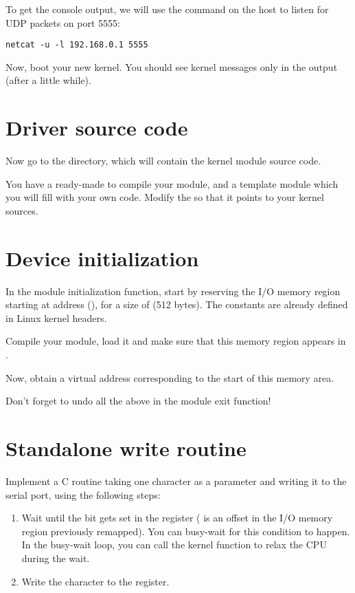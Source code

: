To get the console output, we will use the  command on the host
to listen for UDP packets on port 5555:

\begin{verbatim}
netcat -u -l 192.168.0.1 5555
\end{verbatim}

Now, boot your new kernel. You should see kernel messages only in the
 output (after a little while).

\section{Driver source code}

Now go to the  directory, which will contain the
kernel module source code.

You have a ready-made  to compile your module, and a
template  module which you will fill with your own
code. Modify the  so that it points to your kernel sources.

\section{Device initialization}

In the module initialization function, start by reserving the I/O
memory region starting at address (), for a
size of  (512 bytes). The  constants are already defined
in Linux kernel headers.

Compile your module, load it and make sure that this memory region
appears in .

Now, obtain a virtual address corresponding to the start of this
memory area.

Don't forget to undo all the above in the module exit function!

\section{Standalone write routine}

Implement a C routine taking one character as a parameter and writing
it to the serial port, using the following steps:

\begin{enumerate}

 \item Wait until the  bit gets set in
 the  register ( is an
 offset in the I/O memory region previously remapped). You can
 busy-wait for this condition to happen. In the busy-wait loop, you
 can call the  kernel function to relax the CPU
 during the wait.

 \item Write the character to the  register.

\end{enumerate}

